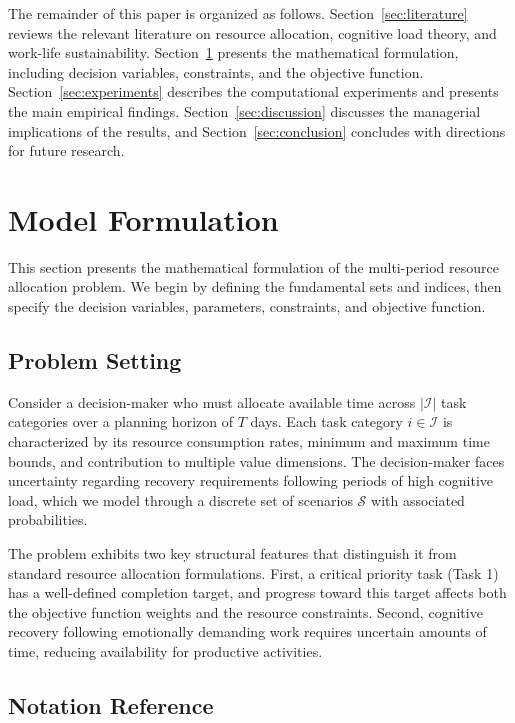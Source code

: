 \documentclass[preprint,review,11pt]{elsarticle}
\begin{document}
The remainder of this paper is organized as follows. Section~\ref{sec:literature} reviews the relevant literature on resource allocation, cognitive load theory, and work-life sustainability. Section~\ref{sec:model} presents the mathematical formulation, including decision variables, constraints, and the objective function. Section~\ref{sec:experiments} describes the computational experiments and presents the main empirical findings. Section~\ref{sec:discussion} discusses the managerial implications of the results, and Section~\ref{sec:conclusion} concludes with directions for future research.



\section{Model Formulation}\label{sec:model}

This section presents the mathematical formulation of the multi-period resource allocation problem. We begin by defining the fundamental sets and indices, then specify the decision variables, parameters, constraints, and objective function.

\subsection{Problem Setting}

Consider a decision-maker who must allocate available time across $|\mathcal{I}|$ task categories over a planning horizon of $T$ days. Each task category $i \in \mathcal{I}$ is characterized by its resource consumption rates, minimum and maximum time bounds, and contribution to multiple value dimensions. The decision-maker faces uncertainty regarding recovery requirements following periods of high cognitive load, which we model through a discrete set of scenarios $\mathcal{S}$ with associated probabilities.

The problem exhibits two key structural features that distinguish it from standard resource allocation formulations. First, a critical priority task (Task 1) has a well-defined completion target, and progress toward this target affects both the objective function weights and the resource constraints. Second, cognitive recovery following emotionally demanding work requires uncertain amounts of time, reducing availability for productive activities.

\subsection{Notation Reference}
\end{document}
